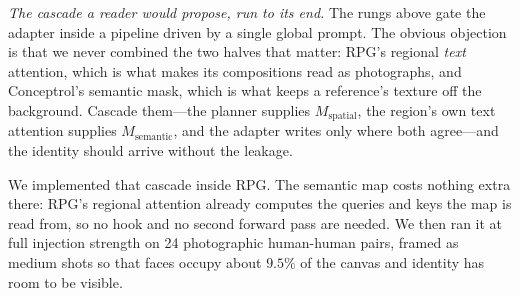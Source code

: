 \documentclass[review,10pt,times]{elsarticle}
\begin{document}
\noindent\textit{The cascade a reader would propose, run to its end.}
The rungs above gate the adapter inside a pipeline driven by a single global
prompt.  The obvious objection is that we never combined the two halves that
matter: RPG's regional \emph{text} attention, which is what makes its
compositions read as photographs, and Conceptrol's semantic mask, which is
what keeps a reference's texture off the background.  Cascade them---the
planner supplies $M_{\mathrm{spatial}}$, the region's own text attention
supplies $M_{\mathrm{semantic}}$, and the adapter writes only where both
agree---and the identity should arrive without the leakage.

We implemented that cascade inside RPG.  The semantic map costs nothing extra
there: RPG's regional attention already computes the queries and keys the map
is read from, so no hook and no second forward pass are needed.  We then ran
it at full injection strength on 24 photographic human-human pairs, framed as
medium shots so that faces occupy about $9.5\%$ of the canvas and identity has
room to be visible.

\begin{table}[htbp]
\centering
\caption{%
  \textbf{The RPG cascade delivers RPG's pictures and none of the identity.}
  ArcFace on detected faces, so the score does not move with framing; $0$ is
  chance.  Text-only RPG is the floor.  Adding the adapter, with or without the
  semantic mask, and at five times the default strength, never leaves it.%
}
\label{tab:cascade}
\end{table}
\end{document}
